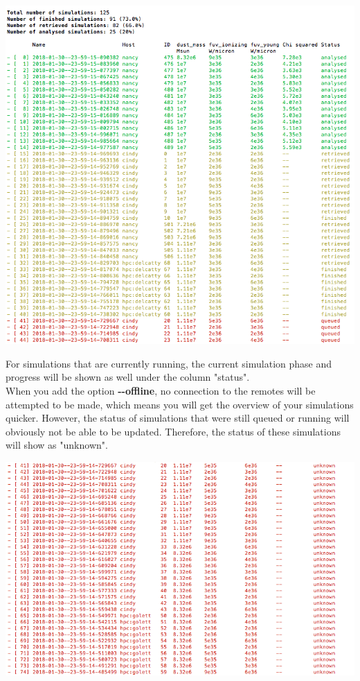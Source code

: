\documentclass[15pt,a4paper,oneside,openright]{report}
\begin{document}
\begin{center}
\includegraphics[width=\textwidth]{figures/generation_status.png}
\end{center}

For simulations that are currently running, the current simulation phase and progress will be shown as well under the column "status".\\

When you add the option \textbf{-{}-offline}, no connection to the remotes will be attempted to be made, which means you will get the overview of your simulations quicker. However, the status of simulations that were still queued or running will obviously not be able to be updated. Therefore, the status of these simulations will show as "unknown".

\begin{center}
\includegraphics[width=\textwidth]{figures/status_unknown.png}
\end{center}
\end{document}
